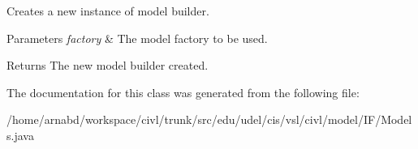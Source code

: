 Creates a new instance of model builder. 


\begin{DoxyParams}{Parameters}
{\em factory} & The model factory to be used. \\
\hline
\end{DoxyParams}
\begin{DoxyReturn}{Returns}
The new model builder created. 
\end{DoxyReturn}


The documentation for this class was generated from the following file\+:\begin{DoxyCompactItemize}
\item 
/home/arnabd/workspace/civl/trunk/src/edu/udel/cis/vsl/civl/model/\+I\+F/Models.\+java\end{DoxyCompactItemize}
